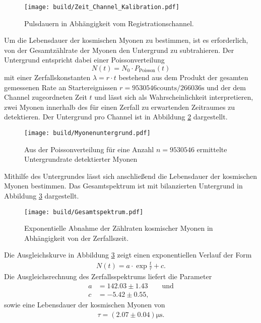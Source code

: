 \FloatBarrier
\begin{figure}
  \centering
  \texttt{[image: build/Zeit\_Channel\_Kalibration.pdf]}
  \caption{Pulsdauern in Abhängigkeit vom Registrationschannel.}
  \label{fig:06}
\end{figure}
\FloatBarrier
\noindent Um die Lebensdauer der kosmischen Myonen zu bestimmen, ist es
erforderlich, von der Gesamtzählrate der Myonen den Untergrund zu subtrahieren.
Der Untergrund entspricht dabei einer Poissonverteilung
\begin{equation}
  N(t) = N_0 \cdot P_{\text{Poisson}}(t)
\end{equation}
mit einer
Zerfallskonstanten $\lambda = r \cdot t$ bestehend aus dem Produkt der gesamten gemessenen Rate an Startereignissen $r = 9530546 \text{counts}/266036 \si{\second}$ und der
dem Channel zugeordneten Zeit $t$ und lässt sich als Wahrscheinlichkeit interpretieren, zwei Myonen
innerhalb des für einen Zerfall zu erwartenden Zeitraumes zu detektieren. Der Untergrund pro Channel ist in Abbildung \ref{fig:07} dargestellt.  \\
\FloatBarrier
\begin{figure}
  \centering
  \texttt{[image: build/Myonenuntergrund.pdf]}
  \caption{Aus der Poissonverteilung für eine Anzahl $n = 9530546$ ermittelte
  Untergrundrate detektierter Myonen}
  \label{fig:07}
\end{figure}
\FloatBarrier
\noindent Mithilfe des Untergrundes lässt sich anschließend die Lebensdauer der
kosmischen Myonen bestimmen. Das Gesamtspektrum ist mit bilanzierten Untergrund
in Abbildung \ref{fig:08} dargestellt. \\
\FloatBarrier
\begin{figure}
  \centering
  \texttt{[image: build/Gesamtspektrum.pdf]}
  \caption{Exponentielle Abnahme der Zählraten kosmischer Myonen in Abhängigkeit
  von der Zerfallszeit.}
  \label{fig:08}
\end{figure}
\FloatBarrier
\noindent Die Ausgleichskurve in Abbildung \ref{fig:08} zeigt einen
exponentiellen Verlauf der Form
\begin{align}
  N(t) = a \cdot \exp{\frac{t}{\tau}} + c.
  \label{eqn:09}
\end{align}
\noindent Die Ausgleichsrechnung des Zerfallsspektrums liefert die Parameter
\begin{align*}
  a &= 142.03 \pm 1.43 \qquad \text{und} \\
  c &= -5.42 \pm 0.55,
\end{align*}
\noindent sowie eine Lebensdauer der kosmischen Myonen von
\begin{align*}
  \tau = (2.07 \pm 0.04) \si{\micro\second}.
\end{align*}
